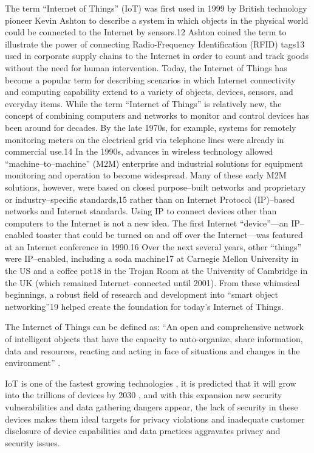 \documentclass[conference]{IEEEtran}
\begin{document}
The term “Internet of Things” (IoT) was first used in 1999 by British technology pioneer Kevin Ashton to
describe a system in which objects in the physical world could be connected to the Internet by sensors.12
Ashton coined the term to illustrate the power of connecting Radio-Frequency Identification (RFID) tags13
used in corporate supply chains to the Internet in order to count and track goods without the need for human
intervention. Today, the Internet of Things has become a popular term for describing scenarios in which
Internet connectivity and computing capability extend to a variety of objects, devices, sensors, and everyday
items.
While the term “Internet of Things” is relatively new, the concept of combining computers and networks to
monitor and control devices has been around for decades. By the late 1970s, for example, systems for
remotely monitoring meters on the electrical grid via telephone lines were already in commercial use.14 In the
1990s, advances in wireless technology allowed “machine–to–machine” (M2M) enterprise and industrial
solutions for equipment monitoring and operation to become widespread. Many of these early M2M
solutions, however, were based on closed purpose–built networks and proprietary or industry–specific
standards,15 rather than on Internet Protocol (IP)–based networks and Internet standards.
Using IP to connect devices other than computers to the Internet is not a new idea. The first Internet
“device”—an IP–enabled toaster that could be turned on and off over the Internet—was featured at an
Internet conference in 1990.16 Over the next several years, other “things” were IP–enabled, including a soda
machine17 at Carnegie Mellon University in the US and a coffee pot18 in the Trojan Room at the University of
Cambridge in the UK (which remained Internet–connected until 2001). From these whimsical beginnings, a
robust field of research and development into “smart object networking”19 helped create the foundation for
today’s Internet of Things.











The Internet of Things can be defined as: ``An open and comprehensive network
of intelligent objects that have the capacity to auto-organize, share information,
data and resources, reacting and acting in face of situations and changes in
the environment'' \cite{madakam2015internet}.

IoT is one of the fastest growing technologies \cite{MohammadState}, it is predicted
that it will grow into the trillions of devices by 2030 \cite{SarawiInternet},
and with this expansion new security vulnerabilities and data gathering dangers
appear, the lack of security in these devices makes them ideal targets for privacy
violations and inadequate customer disclosure of device capabilities and data
practices aggravates privacy and security issues.
\end{document}
